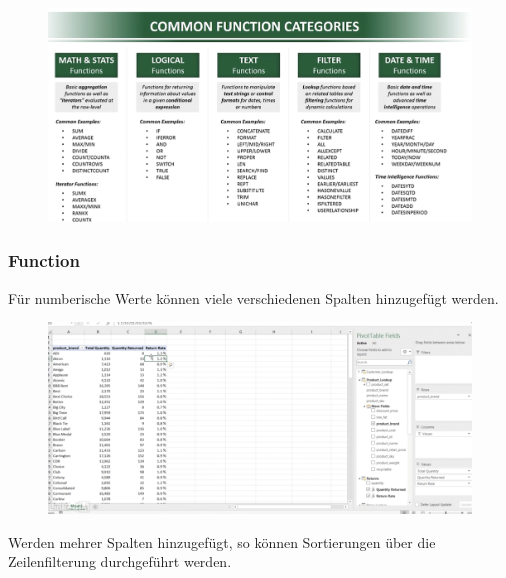 \begin{figure}[H]
	\centering
	\includegraphics[scale = 0.3]{attachment/chapter_1/screenshot089}
	\caption{}
	\label{fig:screenshot089}
\end{figure}

\subsubsection{Function} 
Für numberische Werte können viele verschiedenen Spalten hinzugefügt werden.

\begin{figure}[H]
	\centering
	\includegraphics[scale = 0.3]{attachment/chapter_1/screenshot090}
	\caption{}
	\label{fig:screenshot090}
\end{figure} 

Werden mehrer Spalten hinzugefügt, so können Sortierungen über die Zeilenfilterung durchgeführt werden.



